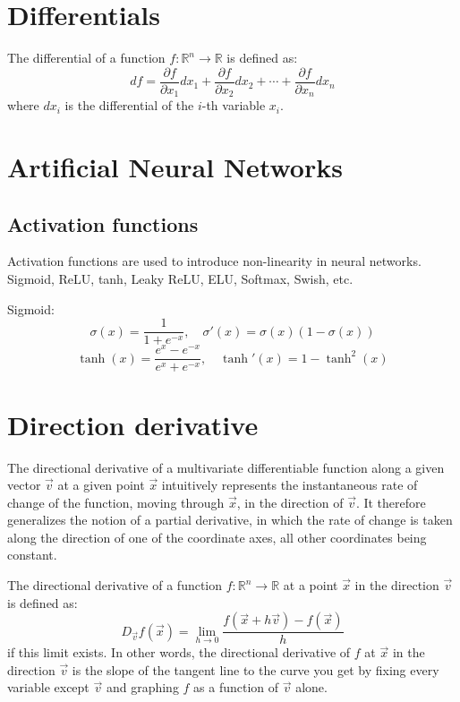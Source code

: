 \section{Differentials}
The differential of a function \( f: \mathbb{R}^n \rightarrow \mathbb{R} \) is defined as:
$$ df = \frac{\partial f}{\partial x_1} dx_1 + \frac{\partial f}{\partial x_2} dx_2 + \cdots + \frac{\partial f}{\partial x_n} dx_n $$
where \( dx_i \) is the differential of the \( i \)-th variable \( x_i \).

\section{Artificial Neural Networks}

\subsection{Activation functions}
Activation functions are used to introduce non-linearity in neural networks.
Sigmoid, ReLU, tanh, Leaky ReLU, ELU, Softmax, Swish, etc.

Sigmoid:
$$\sigma(x) = \frac{1}{1+e^{-x}}, \quad \sigma'(x) = \sigma(x)(1-\sigma(x))$$
$$\tanh(x) = \frac{e^x - e^{-x}}{e^x + e^{-x}}, \quad \tanh'(x) = 1 - \tanh^2(x)$$



\section{Direction derivative}
The directional derivative of a multivariate differentiable function along a given vector \( \vec{v} \) at a given point \( \vec{x} \) intuitively represents the instantaneous rate of change of the function, moving through \( \vec{x} \), in the direction of \( \vec{v} \). It therefore generalizes the notion of a partial derivative, in which the rate of change is taken along the direction of one of the coordinate axes, all other coordinates being constant.

The directional derivative of a function \( f: \mathbb{R}^n \rightarrow \mathbb{R} \) at a point \( \vec{x} \) in the direction \( \vec{v} \) is defined as:
$$ D_{\vec{v}} f(\vec{x}) = \lim_{h \rightarrow 0} \frac{f(\vec{x} + h\vec{v}) - f(\vec{x})}{h} $$
if this limit exists. In other words, the directional derivative of \( f \) at \( \vec{x} \) in the direction \( \vec{v} \) is the slope of the tangent line to the curve you get by fixing every variable except \( \vec{v} \) and graphing \( f \) as a function of \( \vec{v} \) alone.

